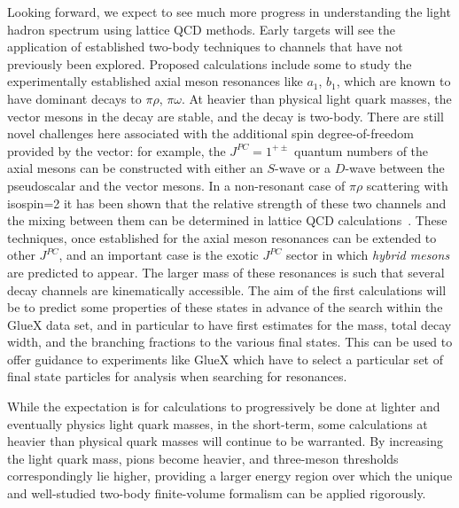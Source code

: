 Looking forward, we expect to see much more progress in understanding the light hadron spectrum using lattice QCD methods. Early targets will see the application of established two-body techniques to channels that have not previously been explored. Proposed calculations include some to study the experimentally established axial meson resonances like $a_1$, $b_1$, which are known to have dominant decays to $\pi \rho$, $\pi \omega$. At heavier than physical light quark masses, the vector mesons in the decay are stable, and the decay is two-body. There are still novel challenges here associated with the additional spin degree-of-freedom provided by the vector: for example, the $J^{PC}=1^{+\pm}$ quantum numbers of the axial mesons can be constructed with either an $S$-wave or a $D$-wave between the pseudoscalar and the vector mesons. In a non-resonant case of $\pi \rho$ scattering with isospin=2 it has been shown that the relative strength of these two channels and the mixing between them can be determined in lattice QCD calculations~\cite{Woss:2018irj}. These techniques, once established for the axial meson resonances can be extended to other $J^{PC}$, and an important case is the exotic $J^{PC}$ sector in which \emph{hybrid mesons} are predicted to appear. The larger mass of these resonances is such that several decay channels are kinematically accessible. The aim of the first calculations will be to predict some properties of these states in advance of the search within the GlueX data set, and in particular to have first estimates for the mass, total decay width, and the branching fractions to the various final states. This can be used to offer guidance to experiments like GlueX which have to select a particular set of final state particles for analysis when searching for resonances.

While the expectation is for calculations to progressively be done at lighter and eventually physics light quark masses, in the short-term, some calculations at heavier than physical quark masses will continue to be warranted. By increasing the light quark mass, pions become heavier, and three-meson thresholds correspondingly lie higher, providing a larger energy region over which the unique and well-studied two-body finite-volume formalism can be applied rigorously. 

